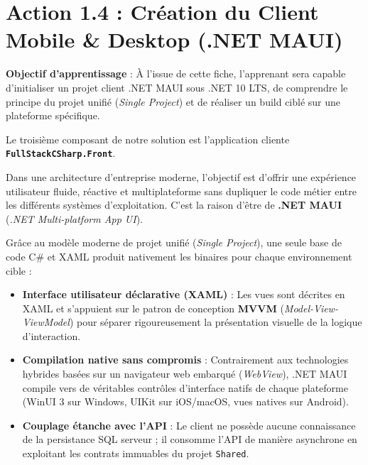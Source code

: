 \section{Action 1.4 : Création du Client Mobile \& Desktop (.NET MAUI)}

\begin{tcolorbox}[colback=indigo!4!white,colframe=indigo!40!white,arc=2mm,boxrule=0.8pt,top=2mm,bottom=2mm,left=3mm,right=3mm]
    \small\textbf{\color{indigo!90!black}Objectif d'apprentissage} : À l'issue de cette fiche, l'apprenant sera capable d'initialiser un projet client .NET MAUI sous .NET 10 LTS, de comprendre le principe du projet unifié (\textit{Single Project}) et de réaliser un build ciblé sur une plateforme spécifique.
\end{tcolorbox}

\vspace{0.1cm}

Le troisième composant de notre solution est l'application cliente \textbf{\texttt{FullStackCSharp.Front}}. 

Dans une architecture d'entreprise moderne, l'objectif est d'offrir une expérience utilisateur fluide, réactive et multiplateforme sans dupliquer le code métier entre les différents systèmes d'exploitation. C'est la raison d'être de \textbf{.NET MAUI} (\textit{.NET Multi-platform App UI}).

Grâce au modèle moderne de projet unifié (\textit{Single Project}), une seule base de code C\# et XAML produit nativement les binaires pour chaque environnement cible :
\begin{itemize}
    \item \textbf{Interface utilisateur déclarative (XAML)} : Les vues sont décrites en XAML et s'appuient sur le patron de conception \textbf{MVVM} (\textit{Model-View-ViewModel}) pour séparer rigoureusement la présentation visuelle de la logique d'interaction.
    \item \textbf{Compilation native sans compromis} : Contrairement aux technologies hybrides basées sur un navigateur web embarqué (\textit{WebView}), .NET MAUI compile vers de véritables contrôles d'interface natifs de chaque plateforme (WinUI 3 sur Windows, UIKit sur iOS/macOS, vues natives sur Android).
    \item \textbf{Couplage étanche avec l'API} : Le client ne possède aucune connaissance de la persistance SQL serveur ; il consomme l'API de manière asynchrone en exploitant les contrats immuables du projet \texttt{Shared}.
\end{itemize}

